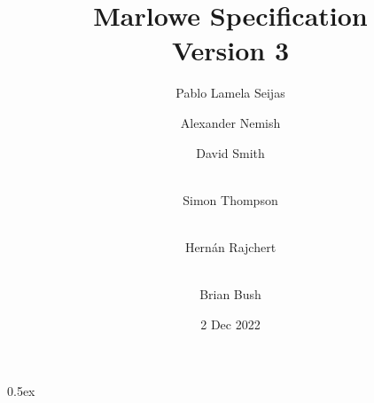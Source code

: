 \documentclass[12pt,a4paper]{report}
\begin{document}
\title{
    \Huge{\textbf{Marlowe Specification}} \\
    \LARGE{Version 3}
}

\author{
Pablo {Lamela Seijas} \and
Alexander Nemish \and
David Smith \and \\
Simon Thompson \and \\
Hernán Rajchert \and \\
Brian Bush
}
\date{2 Dec 2022}
\maketitle

\tableofcontents

\parindent 0pt\parskip 0.5ex

% 








% 
% 
% 

\appendix







%
%
\end{document}
